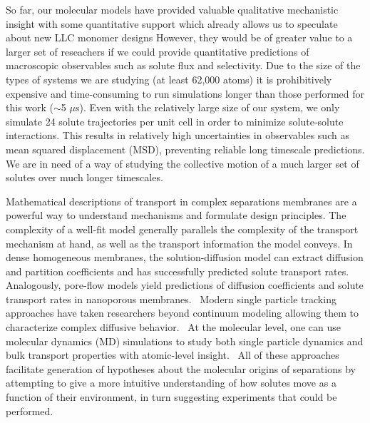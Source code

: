 \documentclass{article}
\begin{document}
  So far, our molecular models have provided valuable qualitative mechanistic insight 
  with some quantitative support which already allows us to speculate about new LLC
  monomer designs
  However, they would be of greater value to a 
  larger set of reseachers
  if we 
  could provide quantitative predictions of macroscopic observables such as solute 
  flux and selectivity. Due to the size of the types of systems we are studying (at least 62,000 atoms)
  it is prohibitively expensive and time-consuming to run simulations longer than 
  those performed for this work ($\sim$5 $\mu$s). 
  Even with the relatively large 
  size of our system, we only simulate 24 solute trajectories per unit cell in order
  to minimize solute-solute interactions. This results in relatively high uncertainties
  in observables such as mean squared displacement (MSD), preventing reliable long
  timescale predictions. We are in need of a way of studying the collective motion
  of a much larger set of solutes over much longer timescales.
  
  Mathematical descriptions of transport in complex separations membranes are 
  a powerful way to understand mechanisms and formulate design principles. 
  \cite{vinh-thang_predictive_2013,geens_transport_2006,darvishmanesh_mass_2016}
  The complexity of a well-fit model generally parallels the complexity of the transport 
  mechanism at hand, as well as the transport information the model conveys.
  In dense homogeneous membranes, the solution-diffusion model can extract 
  diffusion and partition coefficients and has successfully predicted solute 
  transport rates.~\cite{wijmans_solution-diffusion_1995} Analogously, pore-flow
  models yield predictions of diffusion coefficients and solute transport rates 
  in nanoporous membranes.~\cite{paul_diffusive_1974} Modern single particle 
  tracking approaches have taken researchers beyond continuum modeling allowing them to 
  characterize complex diffusive behavior.~\cite{manzo_review_2015} At the molecular
  level, one can use molecular dynamics (MD) simulations to study both single 
  particle dynamics and bulk transport properties with atomic-level insight.~\cite{coscia_chemically_2019,maginn_best_2018}
  All of these approaches facilitate generation of hypotheses about the
  molecular origins of separations by attempting to give a more intuitive 
  understanding of how solutes move as a function of their environment, in turn
  suggesting experiments that could be performed.
\end{document}
